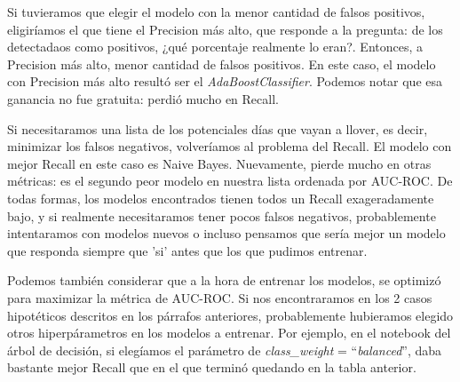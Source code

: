 \documentclass[12pt]{article}
\numberwithin{equation}{section}
\numberwithin{figure}{section}
\numberwithin{table}{section}
\begin{document}
	Si tuvieramos que elegir el modelo con la menor cantidad de falsos positivos,
	eligiríamos el que tiene el Precision más alto, que responde a la pregunta:
	de los detectadaos como positivos, ¿qué porcentaje realmente lo eran?. Entonces,
	a Precision más alto, menor cantidad de falsos positivos. En este caso, el
	modelo con Precision más alto resultó ser el \textit{AdaBoostClassifier}. Podemos
	notar que esa ganancia no fue gratuita: perdió mucho en Recall.

	Si necesitaramos una lista de los potenciales días que vayan a llover, es decir,
	minimizar los falsos negativos, volveríamos al problema del Recall. El modelo
	con mejor Recall en este caso es Naive Bayes. Nuevamente, pierde mucho en otras
	métricas: es el segundo peor modelo en nuestra lista ordenada por AUC-ROC. De
	todas formas, los modelos encontrados tienen todos un Recall exageradamente bajo, y
	si realmente necesitaramos tener pocos falsos negativos, probablemente intentaramos
	con modelos nuevos o incluso pensamos que sería mejor un modelo que responda siempre
	que 'si' antes que los que pudimos entrenar.

	Podemos también considerar que a la hora de entrenar los modelos, se optimizó para 
	maximizar la métrica de AUC-ROC. Si nos encontraramos en los 2 casos hipotéticos
	descritos en los párrafos anteriores, probablemente hubieramos elegido otros
	hiperpárametros en los modelos a entrenar. Por ejemplo, en el notebook del 
	árbol de decisión, si elegíamos el parámetro de \textit{class\_weight} = 
	``\textit{balanced}'', daba bastante mejor Recall que en el que terminó quedando en la
	 tabla anterior.

	
\end{document}
